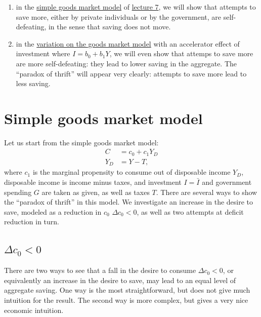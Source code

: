 \documentclass[]{book}
\theoremstyle{definition}
\theoremstyle{definition}
\theoremstyle{definition}
\theoremstyle{remark}
\begin{document}
\begin{enumerate}
\def\labelenumi{\arabic{enumi}.}
\item
  in the \protect\hyperlink{simple}{simple goods market model} of
  \protect\hyperlink{cons-function}{lecture 7}, we will show that
  attempts to save more, either by private individuals or by the
  government, are self-defeating, in the sense that saving does not
  move.
\item
  in the \protect\hyperlink{extended}{variation on the goods market
  model} with an accelerator effect of investment where \(I=b_0+b_1Y\),
  we will even show that attemps to save more are more self-defeating:
  they lead to lower saving in the aggregate. The ``paradox of thrift''
  will appear very clearly: attempts to save more lead to less saving.
\end{enumerate}

\hypertarget{simple}{\section{Simple goods market model}\label{simple}}

Let us start from the simple goods market model: \[
\begin{aligned}
C   &=c_{0}+c_{1}Y_{D}\\
Y_{D}   &=Y-T,
\end{aligned}
\] where \(c_{1}\) is the marginal propensity to consume out of
disposable income \(Y_{D}\), disposable income is income minus taxes,
and investment \(I=\bar{I}\) and government spending \(G\) are taken as
given, as well as taxes \(T\). There are several ways to show the
``paradox of thrift'' in this model. We investigate an increase in the
desire to save, modeled as a reduction in \(c_0\) \(\Delta c_0<0\), as
well as two attempts at deficit reduction in turn.

\subsection{\texorpdfstring{\(\Delta c_{0}<0\)}{\textbackslash{}Delta c\_\{0\}\textless{}0}}\label{delta-c_00}

There are two ways to see that a fall in the desire to consume
\(\Delta c_0 <0\), or equivalently an increase in the desire to save,
may lead to an equal level of aggregate saving. One way is the most
straightforward, but does not give much intuition for the result. The
second way is more complex, but gives a very nice economic intuition.
\end{document}
